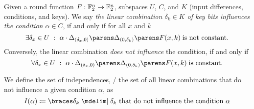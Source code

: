 \begin{definition}
    Given a round function $F : \mathbb{F}_2^n \to \mathbb{F}_2^n$, subspaces $U$, $C$, and $K$ (input differences, conditions, and keys).
    We say \emph{the linear combination $\delta_k \in K$ of key bits influences the condition $\alpha \in C$}, if and only if for all $x$ and $k$
    \begin{equation*}
        \exists \delta_x \in U\ :\ \iprod{\alpha}{\derive{(\delta_x, 0)}{\derive{(0, \delta_k)}{F}}(x, k)}\; \text{is not constant.}
    \end{equation*}
    Conversely, the linear combination \emph{does not influence} the condition, if and only if
    \begin{equation*}
        \forall \delta_x \in U\ :\ \iprod{\alpha}{\derive{(\delta_x, 0)}{\derive{(0, \delta_k)}{F}}(x, k)}\; \text{is constant.}
    \end{equation*}

    We define the set of independences, \ie/ the set of all linear combinations that do not influence a given condition $\alpha$, as
    \begin{equation*}
        I(\alpha) \coloneqq \set{\delta_k \given \text{$\delta_k$ that do not influence the condition $\alpha$}}
    \end{equation*}
\end{definition}

